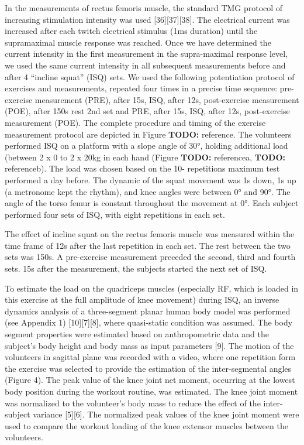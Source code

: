 \documentclass[utf8]{style/FrontiersinHarvard}
\newcommand{\TODO}[1]{{\textbf{TODO:} {\color{red} #1}}}
\begin{document}
In the measurements of rectus femoris muscle, the standard TMG protocol of increasing stimulation intensity was used [36][37][38].
The electrical current was increased after each twitch electrical stimulus (1ms duration) until the supramaximal muscle response was reached.
Once we have determined the current intensity in the first measurement in the supra-maximal response level, we used the same current intensity in all subsequent measurements before and after 4 “incline squat” (ISQ) sets.
We used the following potentiation protocol of exercises and measurements, repeated four times in a precise time sequence: pre-exercise measurement (PRE), after 15s, ISQ, after 12s, post-exercise measurement (POE), after 150s rest 2nd set and PRE, after 15s, ISQ, after 12s, post-exercise measurement (POE).
The complete procedure and timing of the exercise measurement protocol are depicted in Figure \TODO{reference}.
The volunteers performed ISQ on a platform with a slope angle of 30°, holding additional load (between 2 x 0 to 2 x 20kg in each hand (Figure \TODO{reference}a, \TODO{reference}b).
The load was chosen based on the 10- repetitions maximum test performed a day before.
The dynamic of the squat movement was 1s down, 1s up (a metronome kept the rhythm), and knee angles were between 0° and 90°.
The angle of the torso femur is constant throughout the movement at 0°.
Each subject performed four sets of ISQ, with eight repetitions in each set.

The effect of incline squat on the rectus femoris muscle was measured within the time frame of 12s after the last repetition in each set.
The rest between the two sets was 150s.
A pre-exercise measurement preceded the second, third and fourth sets.
15s after the measurement, the subjects started the next set of ISQ.

To estimate the load on the quadriceps muscles (especially RF, which is loaded in this exercise at the full amplitude of knee movement) during ISQ, an inverse dynamics analysis of a three-segment planar human body model was performed (see Appendix 1) [10][7][8], where quasi-static condition was assumed.
The body segment properties were estimated based on anthropometric data and the subject’s body height and body mass as input parameters [9].
The motion of the volunteers in sagittal plane was recorded with a video, where one repetition form the exercise was selected to provide the estimation of the inter-segmental angles (Figure 4).
The peak value of the knee joint net moment, occurring at the lowest body position during the workout routine, was estimated.
The knee joint moment was normalized to the volunteer’s body mass to reduce the effect of the inter-subject variance [5][6].
The normalized peak values of the knee joint moment were used to compare the workout loading of the knee extensor muscles between the volunteers.
\end{document}
